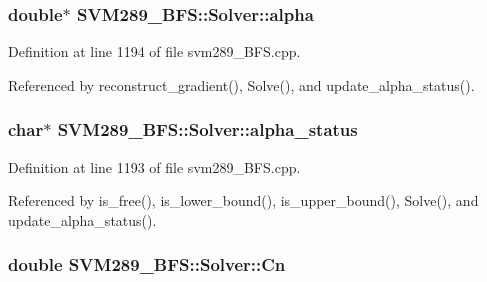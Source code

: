 \subsubsection[{\texorpdfstring{alpha}{alpha}}]{\setlength{\rightskip}{0pt plus 5cm}double$\ast$ S\+V\+M289\+\_\+\+B\+F\+S\+::\+Solver\+::alpha\hspace{0.3cm}{\ttfamily [protected]}}\hypertarget{class_s_v_m289___b_f_s_1_1_solver_a8a95f4c9f0b029661c53d858534c0408}{}\label{class_s_v_m289___b_f_s_1_1_solver_a8a95f4c9f0b029661c53d858534c0408}


Definition at line 1194 of file svm289\+\_\+\+B\+F\+S.\+cpp.



Referenced by reconstruct\+\_\+gradient(), Solve(), and update\+\_\+alpha\+\_\+status().

\subsubsection[{\texorpdfstring{alpha\+\_\+status}{alpha_status}}]{\setlength{\rightskip}{0pt plus 5cm}char$\ast$ S\+V\+M289\+\_\+\+B\+F\+S\+::\+Solver\+::alpha\+\_\+status\hspace{0.3cm}{\ttfamily [protected]}}\hypertarget{class_s_v_m289___b_f_s_1_1_solver_ac02e702c2d611adf01940d51cf204ecd}{}\label{class_s_v_m289___b_f_s_1_1_solver_ac02e702c2d611adf01940d51cf204ecd}


Definition at line 1193 of file svm289\+\_\+\+B\+F\+S.\+cpp.



Referenced by is\+\_\+free(), is\+\_\+lower\+\_\+bound(), is\+\_\+upper\+\_\+bound(), Solve(), and update\+\_\+alpha\+\_\+status().

\subsubsection[{\texorpdfstring{Cn}{Cn}}]{\setlength{\rightskip}{0pt plus 5cm}double S\+V\+M289\+\_\+\+B\+F\+S\+::\+Solver\+::\+Cn\hspace{0.3cm}{\ttfamily [protected]}}\hypertarget{class_s_v_m289___b_f_s_1_1_solver_ad0dd3ddc87834e0b9dbe7d2132a440ea}{}\label{class_s_v_m289___b_f_s_1_1_solver_ad0dd3ddc87834e0b9dbe7d2132a440ea}


